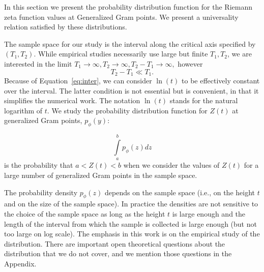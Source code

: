 \documentclass[twoside]{article}
\begin{document}
In this section we present the probability distribution function for the Riemann zeta function
values at Generalized Gram points. We present a universality relation satisfied by these distributions.

The sample space for our study is the interval along the critical axis specified by $(T_1, T_2)$. 
While empirical studies necessarily use large but finite  $T_1, T_2$, we are interested in the limit 
$T_1 \rightarrow \infty, T_2 \rightarrow \infty,  T_2-T_1 \rightarrow \infty,$ however
\begin{equation}
T_2 - T_1  \ll T_1. 
\label{eq:inter}
\end{equation}
Because of Equation~\ref{eq:inter}, we can consider  $\ln (t)$  to be effectively constant over  the interval.
The latter condition is not essential but is convenient, in that it simplifies the numerical work. 
The notation $\ln (t)$ stands for the natural logarithm of $t$.  
We study the probability distribution function for $Z(t)$ at generalized Gram  points,
 $p_{\phi}(y)$:
\begin{definition}\label{pphi}
\begin{equation}
\int\limits_{a}^{b} p_{\phi}(z)dz
\label{eq:pdfphi}
\end{equation}
is the probability that $a<Z(t)<b$ when we consider the values of $Z(t)$ for a large number of 
generalized Gram points in the sample space. 
\end{definition}
The probability density  $p_{\phi}(z)$ depends on the sample space (i.e., on the height $t$ and on the size of 
the sample space). In practice the densities are not sensitive to the choice of the sample space as long as 
the height $t$ is large enough and the length of the interval from which the sample is collected is large enough 
(but not too large on log scale). The emphasis in this work is on the empirical study of the distribution. 
There are important open theoretical questions about the distribution that we do not cover, 
and we mention those questions in the Appendix.
\end{document}
